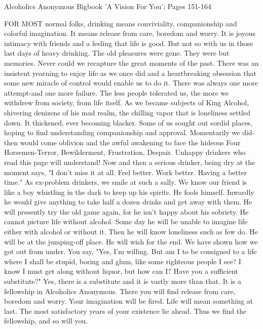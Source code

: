 
Alcoholics Anonymous Bigbook 'A Vision For You'; Pages 151-164

\begin{biblechapter}
FOR MOST normal folks, drinking means conviviality, companionship and colorful imagination.  It means release from care, boredom and worry.  It is joyous intimacy with friends and a feeling that life is good.  But not so with us in those last days of heavy drinking.  The old pleasures were gone.  They were but memories.  Never could we recapture the great moments of the past.  There was an insistent yearning to enjoy life as we once did and a heartbreaking obsession that some new miracle of control would enable us to do it.  There was always one more attempt-and one more failure.
The less people tolerated us, the more we withdrew from society, from life itself.  As we became subjects of King Alcohol, shivering denizens of his mad realm, the chilling vapor that is loneliness settled down.  It thickened, ever becoming blacker.  Some of us sought out sordid places, hoping to find understanding companionship and approval.  Momentarily we did-then would come oblivion and the awful awakening to face the hideous Four Horsemen-Terror, Bewilderment, Frustration, Despair.  Unhappy drinkers who read this page will understand!
Now and then a serious drinker, being dry at the moment says, "I don't miss it at all.  Feel better.  Work better.  Having a better time."  As ex-problem drinkers, we smile at such a sally.  We know our friend is like a boy whistling in the dark to keep up his spirits.  He fools himself.  Inwardly he would give anything to take half a dozen drinks and get away with them.  He will presently try the old game again, for he isn't happy about his sobriety.  He cannot picture life without alcohol.  Some day he will be unable to imagine life either with alcohol or without it.  Then he will know loneliness such as few do.  He will be at the jumping-off place.  He will wish for the end.
We have shown how we got out from under.  You say, "Yes, I'm willing.  But am I to be consigned to a life where I shall be stupid, boring and glum, like some righteous people I see?  I know I must get along without liquor, but how can I?  Have you a sufficient substitute?"
Yes, there is a substitute and it is vastly more than that.  It is a fellowship in Alcoholics Anonymous.  There you will find release from care, boredom and worry.  Your imagination will be fired.  Life will mean something at last.  The most satisfactory years of your existence lie ahead.  Thus we find the fellowship, and so will you.

\end{biblechapter}
